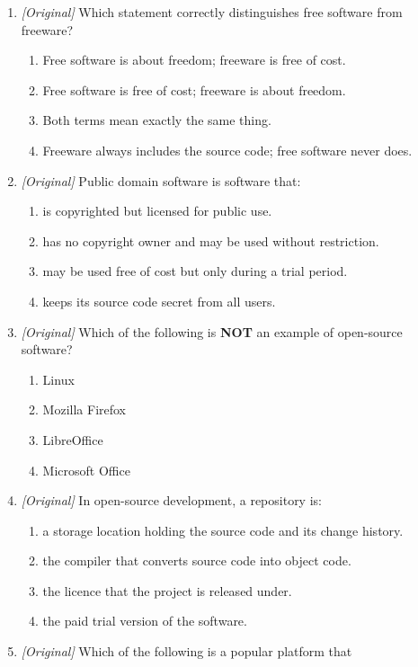 \documentclass[11pt]{article}
\begin{document}
\begin{enumerate}[label=\textbf{Q\arabic*.}, leftmargin=*]
\begin{enumerate}[label=\Alph*.]
  \end{enumerate}
\item \textit{[Original]} Which statement correctly distinguishes free software
  from freeware?
  \begin{enumerate}[label=\Alph*.]
    \item Free software is about freedom; freeware is free of cost.
    \item Free software is free of cost; freeware is about freedom.
    \item Both terms mean exactly the same thing.
    \item Freeware always includes the source code; free software never does.
  \end{enumerate}
\item \textit{[Original]} Public domain software is software that:
  \begin{enumerate}[label=\Alph*.]
    \item is copyrighted but licensed for public use.
    \item has no copyright owner and may be used without restriction.
    \item may be used free of cost but only during a trial period.
    \item keeps its source code secret from all users.
  \end{enumerate}
\item \textit{[Original]} Which of the following is \textbf{NOT} an example of
  open-source software?
  \begin{enumerate}[label=\Alph*.]
    \item Linux
    \item Mozilla Firefox
    \item LibreOffice
    \item Microsoft Office
  \end{enumerate}
\item \textit{[Original]} In open-source development, a repository is:
  \begin{enumerate}[label=\Alph*.]
    \item a storage location holding the source code and its change history.
    \item the compiler that converts source code into object code.
    \item the licence that the project is released under.
    \item the paid trial version of the software.
  \end{enumerate}
\item \textit{[Original]} Which of the following is a popular platform that

\end{enumerate}
\end{document}
